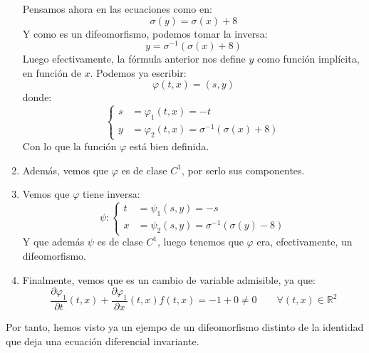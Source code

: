 \begin{ejemplo}
\begin{enumerate}
            Pensamos ahora en las ecuaciones como en:
            \begin{equation*}
                \sigma(y) = \sigma(x) + 8
            \end{equation*}
            Y como es un difeomorfismo, podemos tomar la inversa:
            \begin{equation*}
                y = \sigma^{-1}(\sigma(x)+8)
            \end{equation*}
            Luego efectivamente, la fórmula anterior nos define $y$ como función implícita, en función de $x$. Podemos ya escribir:
            \begin{equation*}
                \varphi(t,x) = (s,y)
            \end{equation*}
            donde:
            \begin{equation*}
                \left\{\begin{array}{rl}
                        s &= \varphi_1(t,x) = -t \\
                        y &= \varphi_2(t,x) = \sigma^{-1}(\sigma(x) + 8)
                \end{array}\right.
            \end{equation*}
            Con lo que la función $\varphi$ está bien definida.

        \item Además, vemos que $\varphi$ es de clase $C^1$, por serlo sus componentes.
        \item Vemos que $\varphi$ tiene inversa:
            \begin{equation*}
                \psi: \left\{\begin{array}{rl}
                        t &= \psi_1(s,y) = -s \\
                        x &= \psi_2(s,y) = \sigma^{-1}(\sigma(y)-8)
                \end{array}\right.
            \end{equation*}
            Y que además $\psi$ es de clase $C^1$, luego tenemos que $\varphi$ era, efectivamente, un difeomorfismo.
        \item Finalmente, vemos que es un cambio de variable admisible, ya que:
            \begin{equation*}
                \dfrac{\partial \varphi_1}{\partial t}(t,x) + \dfrac{\partial\varphi_1}{\partial x}(t,x)f(t,x) = -1 + 0 \neq 0 \qquad \forall (t,x)\in \mathbb{R}^2
            \end{equation*}
    \end{enumerate}
    Por tanto, hemos visto ya un ejempo de un difeomorfismo distinto de la identidad que deja una ecuación diferencial invariante.
\end{ejemplo}~\\

